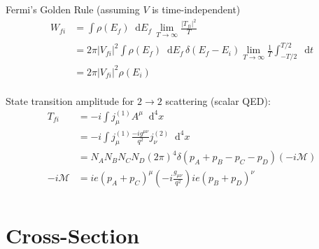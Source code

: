 \documentclass[12pt]{article}
\newcommand{\diff}{\mathop{}\!\mathrm{d}}
\theoremstyle{definition}
\begin{document}
Fermi's Golden Rule (assuming $V$ is time-independent)
\begin{equation*}
\begin{split}
    W_{fi}
        &= \int \rho(E_f) \diff E_f \, \lim_{T \to \infty} \frac{|T_{fi}|^2}{T} \\
        &= 2\pi |V_{fi}|^2 \int \rho(E_f) \diff E_f \, \delta(E_f - E_i) \lim_{T \to \infty} \frac{1}{T} \int_{-T/2}^{T/2} \diff t \\
        &= 2\pi |V_{fi}|^2 \rho(E_i) \\
\end{split}
\end{equation*}
 
State transition amplitude for $2 \to 2$ scattering (scalar QED):
\begin{equation*}
\begin{split}
    T_{fi} &= -i \int j^{(1)}_\mu A^\mu \diff^4 x \\
        &= -i \int j^{(1)}_\mu \frac{-i g^{\mu\nu}}{q^2} j^{(2)}_\nu \diff^4 x \\
        &= N_A N_B N_C N_D (2\pi)^4 \delta(p_A + p_B - p_C - p_D) (-i\mathcal{M}) \\
    -i\mathcal{M} &= ie(p_A + p_C)^\mu \left( -i \frac{g_{\mu\nu}}{q^2} \right) ie(p_B + p_D)^\nu \\
\end{split}
\end{equation*}

\section{Cross-Section}
\end{document}
